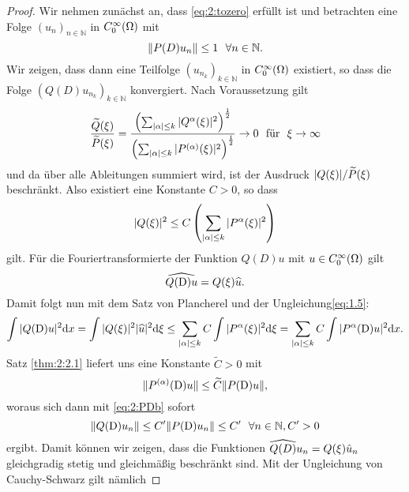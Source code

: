 \begin{proof}
\item Wir nehmen zunächst an, dass \eqref{eq:2:tozero} erfüllt ist und betrachten eine Folge ${(u_n)}_{n \in \mathbb{N}} $ in $C^\infty_0(\Omega)$ mit
\begin{equation}\label{eq:2:PDb}
\lVert P(D)u_n\rVert\leq1 \ \ \forall n \in \mathbb{N}.
\end{equation}
Wir zeigen, dass dann eine Teilfolge ${(u_{n_k})}_{k \in \mathbb{N}}$ in $C^\infty_0(\Omega)$ existiert,
so dass die Folge $\left(Q(D)u_{n_k}\right)_{k \in \mathbb{N}}$ konvergiert.
Nach Voraussetzung gilt 
\begin{equation}
\frac{\widetilde{Q}(\xi)}{\widetilde{P}(\xi)} = \frac{\left( \sum_{|\alpha| \leq k} | Q^{\alpha} (\xi)|^2 \right)^{\frac{1}{2}} }{ \left(\sum_{|\alpha| \leq k} | P^{(\alpha)} (\xi)|^2\right)^{\frac{1}{2}}} \rightarrow 0\ \ \text{für} \ \ \xi \rightarrow \infty
\end{equation}
und da über alle Ableitungen summiert wird, ist der Ausdruck $|Q(\xi)|/\widetilde{P}(\xi)$ beschränkt. Also existiert eine Konstante $C>0$, so dass
\begin{equation}
|Q(\xi)|^2 \leq C \left(\sum_{|\alpha| \leq k} | P^{\alpha} (\xi)|^2 \right)\label{eq:1.5}
\end{equation}
gilt. Für die Fouriertransformierte der Funktion $Q(D)u$ mit $u \in C^\infty_0(\Omega)$ gilt 
\begin{equation}
\widehat{Q(\mathrm D)u} = Q(\xi) \widehat{u}.
\end{equation}
Damit folgt nun mit dem Satz von Plancherel und der Ungleichung\eqref{eq:1.5}:
\begin{equation}
\int |Q(\mathrm D)u|^2 \mathrm{d}x = \int |Q(\xi)|^2 |\widehat{u}|^2 \mathrm{d}\xi \leq  \sum_{|\alpha| \leq k}C\int | P^{\alpha} (\xi)|^2 \mathrm{d}\xi =\sum_{|\alpha| \leq k} C\int |P^{\alpha}(\mathrm D)u|^2 \mathrm{d}x.
\end{equation}
Satz \ref{thm:2:2.1} liefert uns eine Konstante $\widetilde{C}>0$ mit
\begin{equation}
\Vert P^{(\alpha)}(\mathrm D)u \Vert \leq \widetilde{C} \Vert P(\mathrm D)u \Vert, \label{eq:ableitung leq PD}
\end{equation}
woraus sich dann mit \eqref{eq:2:PDb} sofort
\begin{equation}
\norm{Q(\D)u_n}\leq C' \norm{P(\D)u_n} \leq C' \ \ \forall n \in \mathbb{N}, C' >0
\end{equation}
ergibt. Damit können wir zeigen, dass die Funktionen $\widehat{Q(D)}u_n = Q(\xi) \hat{u}_n$ gleichgradig stetig und gleichmäßig beschränkt sind. Mit der Ungleichung von Cauchy-Schwarz gilt nämlich

\end{proof}
